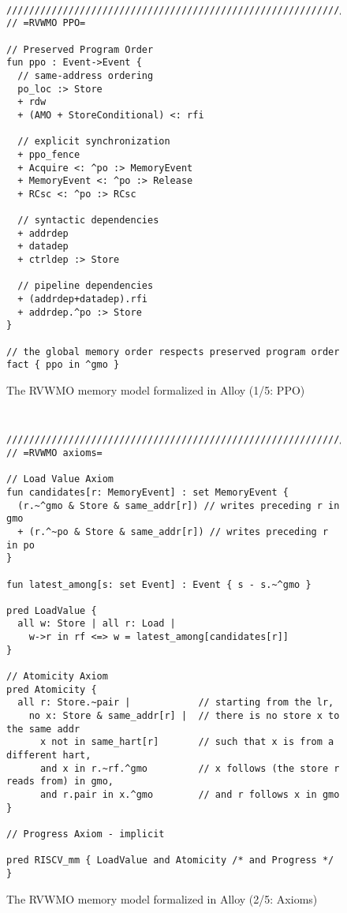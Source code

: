 \begin{figure}[h!]
  {
  \tt\bfseries\centering\footnotesize
  \begin{lstlisting}
////////////////////////////////////////////////////////////////////////////////
// =RVWMO PPO=

// Preserved Program Order
fun ppo : Event->Event {
  // same-address ordering
  po_loc :> Store
  + rdw
  + (AMO + StoreConditional) <: rfi

  // explicit synchronization
  + ppo_fence
  + Acquire <: ^po :> MemoryEvent
  + MemoryEvent <: ^po :> Release
  + RCsc <: ^po :> RCsc

  // syntactic dependencies
  + addrdep
  + datadep
  + ctrldep :> Store

  // pipeline dependencies
  + (addrdep+datadep).rfi
  + addrdep.^po :> Store
}

// the global memory order respects preserved program order
fact { ppo in ^gmo }
\end{lstlisting}}
  \caption{The RVWMO memory model formalized in Alloy (1/5: PPO)}
  \label{fig:alloy1}
\end{figure}
\begin{figure}[h!]
  {
  \tt\bfseries\centering\footnotesize
  \begin{lstlisting}
////////////////////////////////////////////////////////////////////////////////
// =RVWMO axioms=

// Load Value Axiom
fun candidates[r: MemoryEvent] : set MemoryEvent {
  (r.~^gmo & Store & same_addr[r]) // writes preceding r in gmo
  + (r.^~po & Store & same_addr[r]) // writes preceding r in po
}

fun latest_among[s: set Event] : Event { s - s.~^gmo }

pred LoadValue {
  all w: Store | all r: Load |
    w->r in rf <=> w = latest_among[candidates[r]]
}

// Atomicity Axiom
pred Atomicity {
  all r: Store.~pair |            // starting from the lr,
    no x: Store & same_addr[r] |  // there is no store x to the same addr
      x not in same_hart[r]       // such that x is from a different hart,
      and x in r.~rf.^gmo         // x follows (the store r reads from) in gmo,
      and r.pair in x.^gmo        // and r follows x in gmo
}

// Progress Axiom - implicit

pred RISCV_mm { LoadValue and Atomicity /* and Progress */ }

\end{lstlisting}}
  \caption{The RVWMO memory model formalized in Alloy (2/5: Axioms)}
  \label{fig:alloy2}
\end{figure}
